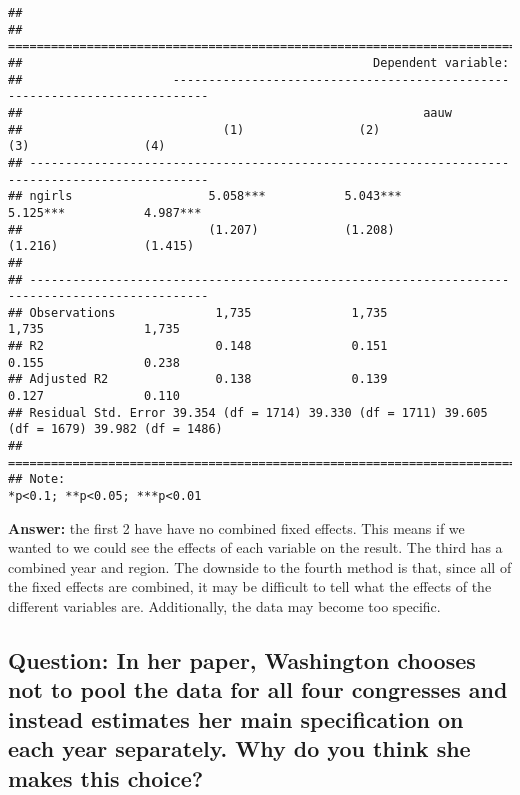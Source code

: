 \documentclass[
]{article}
\begin{document}
\begin{verbatim}
## 
## ===============================================================================================
##                                                 Dependent variable:                            
##                     ---------------------------------------------------------------------------
##                                                        aauw                                    
##                            (1)                (2)                (3)                (4)        
## -----------------------------------------------------------------------------------------------
## ngirls                   5.058***           5.043***           5.125***           4.987***     
##                          (1.207)            (1.208)            (1.216)            (1.415)      
##                                                                                                
## -----------------------------------------------------------------------------------------------
## Observations              1,735              1,735              1,735              1,735       
## R2                        0.148              0.151              0.155              0.238       
## Adjusted R2               0.138              0.139              0.127              0.110       
## Residual Std. Error 39.354 (df = 1714) 39.330 (df = 1711) 39.605 (df = 1679) 39.982 (df = 1486)
## ===============================================================================================
## Note:                                                               *p<0.1; **p<0.05; ***p<0.01
\end{verbatim}

\textbf{Answer:} the first 2 have have no combined fixed effects. This
means if we wanted to we could see the effects of each variable on the
result. The third has a combined year and region. The downside to the
fourth method is that, since all of the fixed effects are combined, it
may be difficult to tell what the effects of the different variables
are. Additionally, the data may become too specific.

\clearpage

\hypertarget{question-in-her-paper-washington-chooses-not-to-pool-the-data-for-all-four-congresses-and-instead-estimates-her-main-specification-on-each-year-separately.-why-do-you-think-she-makes-this-choice}{%
\subsection{Question: In her paper, Washington chooses not to pool the
data for all four congresses and instead estimates her main
specification on each year separately. Why do you think she makes this
choice?}\label{question-in-her-paper-washington-chooses-not-to-pool-the-data-for-all-four-congresses-and-instead-estimates-her-main-specification-on-each-year-separately.-why-do-you-think-she-makes-this-choice}}
\end{document}
